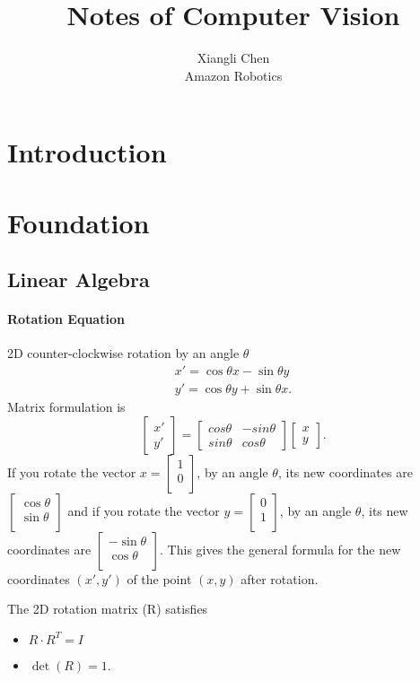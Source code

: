 \documentclass{article}
\title{Notes of Computer Vision}
\author{
  Xiangli Chen \\
  Amazon Robotics\\
}
\begin{document}
\maketitle

\section{Introduction}
\section{Foundation}
\subsection{Linear Algebra}
\paragraph{Rotation Equation}
2D counter-clockwise rotation by an angle $\theta$
\begin{align*}
x' = \cos \theta x - \sin \theta y \\
y' = \cos \theta y + \sin \theta x.
\end{align*}
Matrix formulation is
\[
\begin{bmatrix}
  x' \\ y'
\end{bmatrix}=
\begin{bmatrix}
  cos\theta & -sin\theta \\
  sin\theta & cos\theta
\end{bmatrix}
\begin{bmatrix}
  x \\ y
\end{bmatrix}.
\]
If you rotate the vector 
$x=\begin{bmatrix}1\\0\\\end{bmatrix}$, by an angle $\theta$, 
its new coordinates are 
$\begin{bmatrix}\cos \theta \\\sin \theta \\\end{bmatrix}$ 
and if you rotate the vector 
$y=\begin{bmatrix}0\\1\\\end{bmatrix}$, 
by an angle $\theta$, its new coordinates are 
$\begin{bmatrix}-\sin \theta \\\cos \theta \\\end{bmatrix}$.
This gives the general formula for the new coordinates $(x', y')$ 
of the point $(x, y)$ after rotation.

The 2D rotation matrix (R) satisfies
\begin{itemize}
\item $R\cdot R^T = I$ 
\item $\det (R) = 1$.
\end{itemize}

\small


\end{document}
